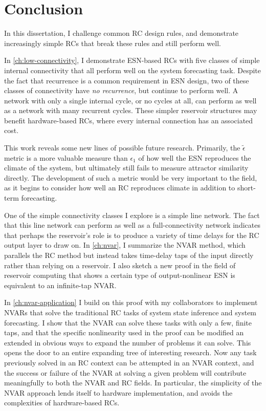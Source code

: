\chapter{Conclusion}\label{ch:conclusion}

In this dissertation, I challenge common RC design rules, and
demonstrate increasingly simple RCs that break these rules and still
perform well.

In \cref{ch:low-connectivity}, I demonstrate ESN-based RCs with five
classes of simple internal connectivity that all perform well on the
system forecasting task. Despite the fact that recurrence is a common
requirement in ESN design, two of these classes of connectivity have
\emph{no recurrence}, but continue to perform well. A network with only a
single internal cycle, or no cycles at all, can perform as well as a
network with many recurrent cycles. These simpler reservoir structures
may benefit hardware-based RCs, where every internal connection has an
associated cost.

This work reveals some new lines of possible future
research. Primarily, the $\tilde{\epsilon}$ metric is a more valuable
measure than $\epsilon_1$ of how well the ESN reproduces the climate
of the system, but ultimately still fails to measure attractor
similarity directly. The development of such a metric would be very
important to the field, as it begins to consider how well an RC
reproduces climate in addition to short-term forecasting.

One of the simple connectivity classes I explore is a simple line
network. The fact that this line network can perform as well as a
full-connectivity network indicates that perhaps the reservoir's role
is to produce a variety of time delays for the RC output layer to draw
on. In \cref{ch:nvar}, I summarize the NVAR method, which parallels
the RC method but instead takes time-delay taps of the input directly
rather than relying on a reservoir. I also sketch a new proof in the
field of reservoir computing that shows a certain type of
output-nonlinear ESN is equivalent to an infinite-tap NVAR.

In \cref{ch:nvar-application} I build on this proof with my
collaborators to implement NVARs that solve the traditional RC tasks
of system state inference and system forecasting. I show
that the NVAR can solve these tasks with only a few, finite taps, and
that the specific nonlinearity used in the proof can be modified an
extended in obvious ways to expand the number of problems it can
solve. This opens the door to an entire expanding tree of interesting
research. Now any task previously solved in an RC context can be
attempted in an NVAR context, and the success or failure of the NVAR
at solving a given problem will contribute meaningfully to both the
NVAR and RC fields. In particular, the simplicity of the NVAR approach
lends itself to hardware implementation, and avoids the complexities
of hardware-based RCs.

